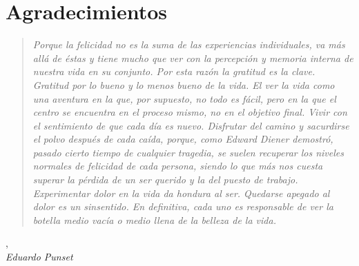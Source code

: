\chapter{Agradecimientos}

\begin{quotation}
\textit{Porque la felicidad no es la suma de las experiencias individuales, va más allá de éstas y tiene mucho que ver con la percepción y memoria interna de nuestra vida en su conjunto. Por esta razón la gratitud es la clave. Gratitud por lo bueno y lo menos bueno de la vida. El ver la vida como una aventura en la que, por supuesto, no todo es fácil, pero en la que el centro se encuentra en el proceso mismo, no en el objetivo final. Vivir con el sentimiento de que cada día es nuevo. Disfrutar del camino y sacurdirse el polvo después de cada caída, porque, como Edward Diener demostró, pasado cierto tiempo de cualquier tragedia, se suelen recuperar los niveles normales de felicidad de cada persona, siendo lo que más nos cuesta superar la pérdida de un ser querido y la del puesto de trabajo. Experimentar dolor en la vida da hondura al ser. Quedarse apegado al dolor es un sinsentido. En definitiva, cada uno es responsable de ver la botella medio vacía o medio llena de la belleza de la vida.}
\end{quotation}

\begin{flushright}
, \\ \textit{Eduardo Punset}
\end{flushright}

